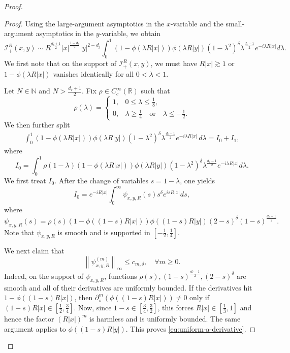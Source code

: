 \documentclass[12pt]{amsart}
\begin{document}
\begin{proof}
\begin{proof}
Using the large-argument asymptotics in the $x$-variable and the small-argument asymptotics in the $y$-variable, we obtain
\begin{equation*}
    \mathcal{I}_{+}^R(x,y)
\sim
R^{\frac{d_\ell+1}{2}}
|x|^{\frac{1-d_\ell}{2}}|y|^{2-d_j}
\int_0^1
(1-\phi(\lambda R|x|))\phi(\lambda R|y|)(1-\lambda^2)^\delta
\lambda^{\frac{d_\ell-1}{2}}e^{-i\lambda R|x|} d\lambda.
\end{equation*}
We first note that on the support of $\mathcal{I}_{+}^R(x,y)$, we must have $R|x|\gtrsim 1$ or $ 1 - \phi(\lambda R|x|) $ vanishes identically for all $0<\lambda<1$. 

Let $N \in \mathbb{N}$ and $N>\frac{d_\ell+1}{2}$. Fix $\rho \in C_c^\infty(\mathbb{R})$ such that
\begin{equation*}
    \rho(\lambda) = \begin{cases}
        1, & 0\le \lambda \le \frac{1}{8},\\
        0, & \lambda \ge \frac{1}{4}\quad \textrm{or}\quad \lambda \le -\frac{1}{2}.
    \end{cases}
\end{equation*}
We then further split 
\begin{align*}
    \int_0^1
(1-\phi(\lambda R|x|))\phi(\lambda R|y|)(1-\lambda^2)^\delta
\lambda^{\frac{d_\ell-1}{2}}e^{-i\lambda R|x|}\, d\lambda = I_0 + I_1,
\end{align*}
where
\begin{equation*}
    I_0 = \int_0^1 \rho(1-\lambda)
(1-\phi(\lambda R|x|))\phi(\lambda R|y|)(1-\lambda^2)^\delta
\lambda^{\frac{d_\ell-1}{2}}e^{-i\lambda R|x|} d\lambda.
\end{equation*}
We first treat $I_0$. After the change of variables $s=1-\lambda$, one yields
\begin{equation*}
    I_0 = e^{-iR|x|}
\int_0^\infty \psi_{x,y,R}(s)s^\delta e^{isR|x|} ds,
\end{equation*}
where
\begin{equation*}
\psi_{x,y,R}(s) =
\rho(s)(1-\phi((1-s)R|x|))\phi((1-s)R|y|)(2-s)^\delta(1-s)^{\frac{d_\ell-1}{2}}.
\end{equation*}
Note that $\psi_{x,y,R}$ is smooth and is supported in $[-\frac{1}{2},\frac{1}{4}]$.

We next claim that 
\begin{equation}\label{eq:uniform-a-derivative}
    \left\| \psi_{x,y,R}^{(m)} \right\|_\infty \le c_{m,\delta},\quad \forall m\ge 0.
\end{equation}
Indeed, on the support of $\psi_{x,y,R}$, functions $\rho(s), (1-s)^{\frac{d_\ell-1}{2}}, (2-s)^\delta$ are smooth and all of their derivatives are uniformly bounded. If the derivatives hit $1-\phi\left( (1-s) R|x| \right)$, then $\partial_s^m \left( \phi\left( (1-s) R|x| \right) \right) \ne 0$ only if $(1-s)R|x| \in [\frac{1}{2}, \frac{3}{4}]$. Now, since $1-s\in [\frac{3}{4},\frac{3}{2}]$, this forces $R|x|\in [\frac{1}{3}, 1]$ and hence the factor $(R|x|)^m$ is harmless and is uniformly bounded. The same argument applies to
$\phi((1-s)R|y|)$. This proves \eqref{eq:uniform-a-derivative}.


\end{proof}
\end{proof}
\end{document}
